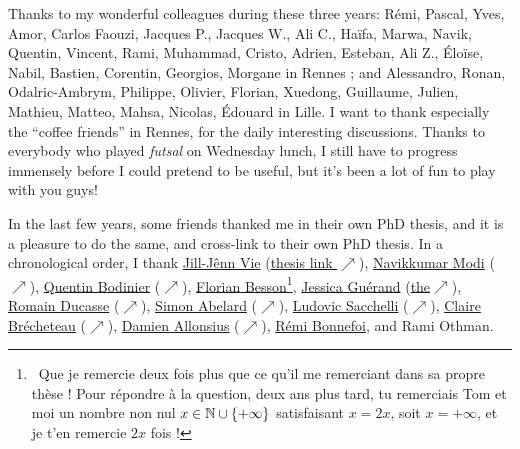 \begin{acknowledgements}
Thanks to my wonderful colleagues during these three years: Rémi\textsuperscript{\tiny{\Coffeecup}}, Pascal\textsuperscript{\tiny{\Coffeecup}}, Yves, Amor, Carlos Faouzi, Jacques P., Jacques W., Ali C., Haïfa, Marwa, Navik, Quentin\textsuperscript{\tiny{\Coffeecup}}, Vincent\textsuperscript{\tiny{\Coffeecup}}, Rami\textsuperscript{\tiny{\Coffeecup}}, Muhammad, Cristo\textsuperscript{\tiny{\Coffeecup}}, Adrien\textsuperscript{\tiny{\Coffeecup}}, Esteban\textsuperscript{\tiny{\Coffeecup}}, Ali Z., Éloïse\textsuperscript{\tiny{\Coffeecup}}, Nabil\textsuperscript{\tiny{\Coffeecup}}, Bastien\textsuperscript{\tiny{\Coffeecup}}, Corentin\textsuperscript{\tiny{\Coffeecup}}, Georgios, Morgane\textsuperscript{\tiny{\Coffeecup}} in Rennes ; and Alessandro, Ronan, Odalric-Ambrym, Philippe, Olivier, Florian, Xuedong, Guillaume, Julien, Mathieu, Matteo, Mahsa, Nicolas, Édouard in Lille.
I want to thank especially the ``coffee friends\textsuperscript{\tiny{\Coffeecup}}'' in Rennes, for the daily interesting discussions.
%
Thanks to everybody who played \emph{futsal} on Wednesday lunch, I still have to progress immensely before I could pretend to be useful, but it's been a lot of fun to play with you guys!


In the last few years, some friends thanked me in their own PhD thesis, and it is a pleasure to do the same, and cross-link to their own PhD thesis.
In a chronological order, I thank
\href{http://jill-jenn.net/}{Jill-Jênn Vie} (\href{https://github.com/jilljenn/phd}{thesis link $\nearrow$}), \href{https://navikkumarmodi.wordpress.com/}{Navikkumar Modi} (\href{https://tel.archives-ouvertes.fr/tel-01668536/document}{$\nearrow$}), \href{https://quentinbodinier.wordpress.com/}{Quentin Bodinier} (\href{https://tel.archives-ouvertes.fr/tel-01731022/document}{$\nearrow$}), \href{https://paris-sorbonne.academia.edu/FBesson}{Florian Besson}\footnote{~Que je remercie deux fois plus que ce qu'il me remerciant dans sa propre thèse ! Pour répondre à la question, deux ans plus tard, tu remerciais Tom et moi un nombre non nul $x\in\mathbb{N}\cup\{+\infty\}$ satisfaisant $x=2x$, soit $x=+\infty$, et je t'en remercie $2x$ fois !}, \href{https://sites.google.com/view/guerand}{Jessica Guérand} (\href{https://www.theses.fr/s175725}{the}\href{https://www.theses.fr/s175725}{$\nearrow$}), \href{https://sites.google.com/view/ducasse/}{Romain Ducasse} (\href{https://drive.google.com/open?id=1u2oxRRimcO0jQfuYwSVwgKfcHU5DdoPK}{$\nearrow$}), \href{https://members.loria.fr/SAbelard/}{Simon Abelard} (\href{https://members.loria.fr/SAbelard/theseabelard.pdf}{$\nearrow$}), \href{http://www.cmap.polytechnique.fr/~sacchelli/}{Ludovic Sacchelli} (\href{https://tel.archives-ouvertes.fr/tel-01893068/document}{$\nearrow$}), \href{http://pages.saclay.inria.fr/claire.brecheteau/}{Claire Brécheteau} (\href{https://hal.archives-ouvertes.fr/tel-01897787/document}{$\nearrow$}), \href{http://www.i2m.univ-amu.fr/perso/damien.allonsius/}{Damien Allonsius} (\href{http://www.i2m.univ-amu.fr/perso/damien.allonsius/documents/recherche/these/Main.pdf}{$\nearrow$}), \href{https://remibonnefoi.wordpress.com/}{Rémi Bonnefoi}, and Rami Othman.



\end{acknowledgements}
